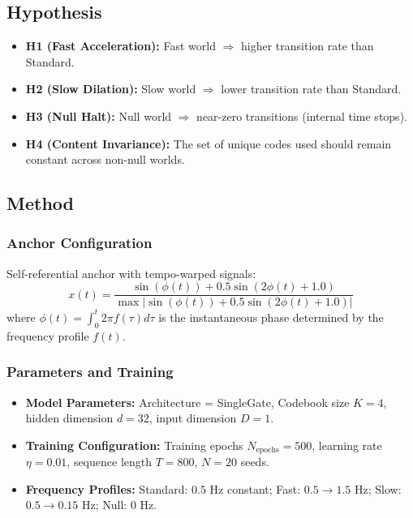 \documentclass{article}
\begin{document}
\subsection{Hypothesis}
\begin{itemize}
    \item \textbf{H1 (Fast Acceleration):} Fast world $\Rightarrow$ higher transition rate than Standard.
    \item \textbf{H2 (Slow Dilation):} Slow world $\Rightarrow$ lower transition rate than Standard.
    \item \textbf{H3 (Null Halt):} Null world $\Rightarrow$ near-zero transitions (internal time stops).
    \item \textbf{H4 (Content Invariance):} The set of unique codes used should remain constant across non-null worlds.
\end{itemize}

\subsection{Method}

\subsubsection{Anchor Configuration}
Self-referential anchor with tempo-warped signals:
\begin{equation}
    x(t) = \frac{\sin(\phi(t)) + 0.5\sin(2\phi(t) + 1.0)}{\max|\sin(\phi(t)) + 0.5\sin(2\phi(t) + 1.0)|}
\end{equation}
where $\phi(t) = \int_0^t 2\pi f(\tau) d\tau$ is the instantaneous phase determined by the frequency profile $f(t)$.

\subsubsection{Parameters and Training}
\begin{itemize}
    \item \textbf{Model Parameters:} Architecture = SingleGate, Codebook size $K=4$, hidden dimension $d=32$, input dimension $D=1$.
    \item \textbf{Training Configuration:} Training epochs $N_{\text{epochs}}=500$, learning rate $\eta=0.01$, sequence length $T=800$, $N=20$ seeds.
    \item \textbf{Frequency Profiles:} Standard: $0.5$ Hz constant; Fast: $0.5 \to 1.5$ Hz; Slow: $0.5 \to 0.15$ Hz; Null: $0$ Hz.
\end{itemize}
\end{document}
